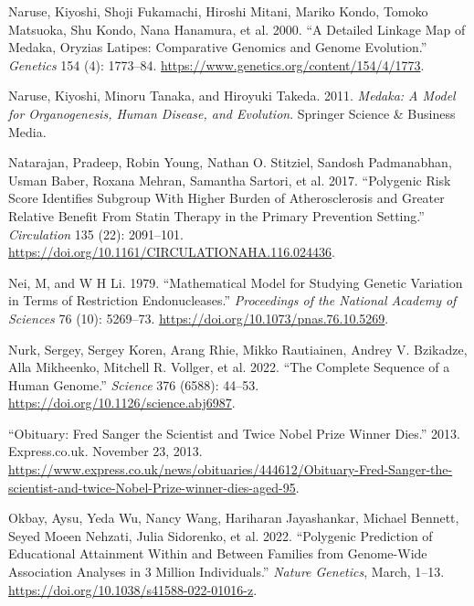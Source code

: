 \documentclass[
]{book}
\newlength{\cslhangindent}
\newlength{\cslentryspacingunit} %
\newenvironment{CSLReferences}[2] %
 {%
  \setlength{\parindent}{0pt}
  \ifodd #1
  \let\oldpar\par
  \def\par{\hangindent=\cslhangindent\oldpar}
  \fi
  \setlength{\parskip}{#2\cslentryspacingunit}
 }%
 {}
\begin{document}
\begin{CSLReferences}{1}{0}
\leavevmode{}%
Naruse, Kiyoshi, Shoji Fukamachi, Hiroshi Mitani, Mariko Kondo, Tomoko Matsuoka, Shu Kondo, Nana Hanamura, et al. 2000. {``A {Detailed Linkage Map} of {Medaka}, {Oryzias} Latipes: {Comparative Genomics} and {Genome Evolution}.''} \emph{Genetics} 154 (4): 1773--84. \url{https://www.genetics.org/content/154/4/1773}.

\leavevmode{}%
Naruse, Kiyoshi, Minoru Tanaka, and Hiroyuki Takeda. 2011. \emph{Medaka: A Model for Organogenesis, Human Disease, and Evolution}. {Springer Science \& Business Media}.

\leavevmode{}%
Natarajan, Pradeep, Robin Young, Nathan O. Stitziel, Sandosh Padmanabhan, Usman Baber, Roxana Mehran, Samantha Sartori, et al. 2017. {``Polygenic {Risk Score Identifies Subgroup With Higher Burden} of {Atherosclerosis} and {Greater Relative Benefit From Statin Therapy} in the {Primary Prevention Setting}.''} \emph{Circulation} 135 (22): 2091--101. \url{https://doi.org/10.1161/CIRCULATIONAHA.116.024436}.

\leavevmode{}%
Nei, M, and W H Li. 1979. {``Mathematical Model for Studying Genetic Variation in Terms of Restriction Endonucleases.''} \emph{Proceedings of the National Academy of Sciences} 76 (10): 5269--73. \url{https://doi.org/10.1073/pnas.76.10.5269}.

\leavevmode{}%
Nurk, Sergey, Sergey Koren, Arang Rhie, Mikko Rautiainen, Andrey V. Bzikadze, Alla Mikheenko, Mitchell R. Vollger, et al. 2022. {``The Complete Sequence of a Human Genome.''} \emph{Science} 376 (6588): 44--53. \url{https://doi.org/10.1126/science.abj6987}.

\leavevmode{}%
{``Obituary: {Fred Sanger} the Scientist and Twice {Nobel Prize} Winner Dies.''} 2013. {Express.co.uk}. November 23, 2013. \url{https://www.express.co.uk/news/obituaries/444612/Obituary-Fred-Sanger-the-scientist-and-twice-Nobel-Prize-winner-dies-aged-95}.

\leavevmode{}%
Okbay, Aysu, Yeda Wu, Nancy Wang, Hariharan Jayashankar, Michael Bennett, Seyed Moeen Nehzati, Julia Sidorenko, et al. 2022. {``Polygenic Prediction of Educational Attainment Within and Between Families from Genome-Wide Association Analyses in 3 Million Individuals.''} \emph{Nature Genetics}, March, 1--13. \url{https://doi.org/10.1038/s41588-022-01016-z}.


\end{CSLReferences}
\end{document}
